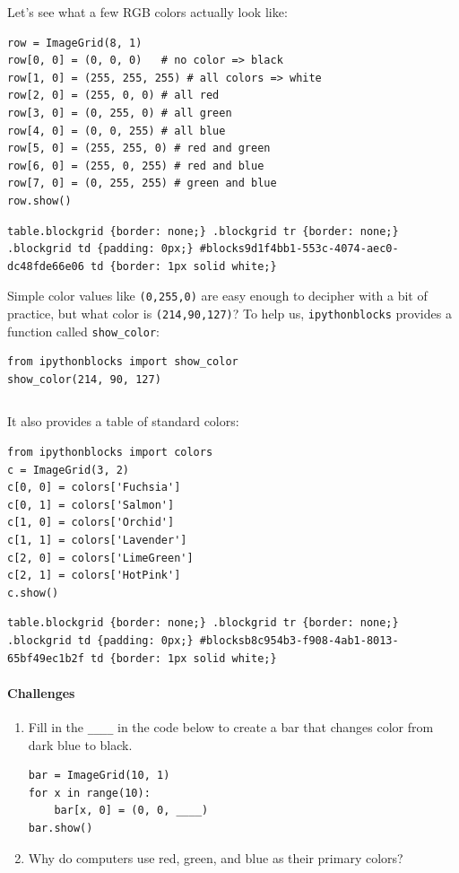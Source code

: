 \documentclass[]{book}
\begin{document}
Let's see what a few RGB colors actually look like:

\begin{verbatim}
row = ImageGrid(8, 1)
row[0, 0] = (0, 0, 0)   # no color => black
row[1, 0] = (255, 255, 255) # all colors => white
row[2, 0] = (255, 0, 0) # all red
row[3, 0] = (0, 255, 0) # all green
row[4, 0] = (0, 0, 255) # all blue
row[5, 0] = (255, 255, 0) # red and green
row[6, 0] = (255, 0, 255) # red and blue
row[7, 0] = (0, 255, 255) # green and blue
row.show()
\end{verbatim}

\begin{verbatim}
table.blockgrid {border: none;} .blockgrid tr {border: none;} .blockgrid td {padding: 0px;} #blocks9d1f4bb1-553c-4074-aec0-dc48fde66e06 td {border: 1px solid white;}
\end{verbatim}

Simple color values like \texttt{(0,255,0)} are easy enough to decipher
with a bit of practice, but what color is \texttt{(214,90,127)}? To help
us, \texttt{ipythonblocks} provides a function called
\texttt{show\_color}:

\begin{verbatim}
from ipythonblocks import show_color
show_color(214, 90, 127)
\end{verbatim}

\begin{verbatim}
\end{verbatim}

It also provides a table of standard colors:

\begin{verbatim}
from ipythonblocks import colors
c = ImageGrid(3, 2)
c[0, 0] = colors['Fuchsia']
c[0, 1] = colors['Salmon']
c[1, 0] = colors['Orchid']
c[1, 1] = colors['Lavender']
c[2, 0] = colors['LimeGreen']
c[2, 1] = colors['HotPink']
c.show()
\end{verbatim}

\begin{verbatim}
table.blockgrid {border: none;} .blockgrid tr {border: none;} .blockgrid td {padding: 0px;} #blocksb8c954b3-f908-4ab1-8013-65bf49ec1b2f td {border: 1px solid white;}
\end{verbatim}

\mbox{}\paragraph{Challenges}

\begin{enumerate}
\item
  Fill in the \texttt{\_\_\_\_} in the code below to create a bar that
  changes color from dark blue to black.

\begin{verbatim}
bar = ImageGrid(10, 1)
for x in range(10):
    bar[x, 0] = (0, 0, ____)
bar.show()
\end{verbatim}
\item
  Why do computers use red, green, and blue as their primary colors?
\end{enumerate}
\end{document}
